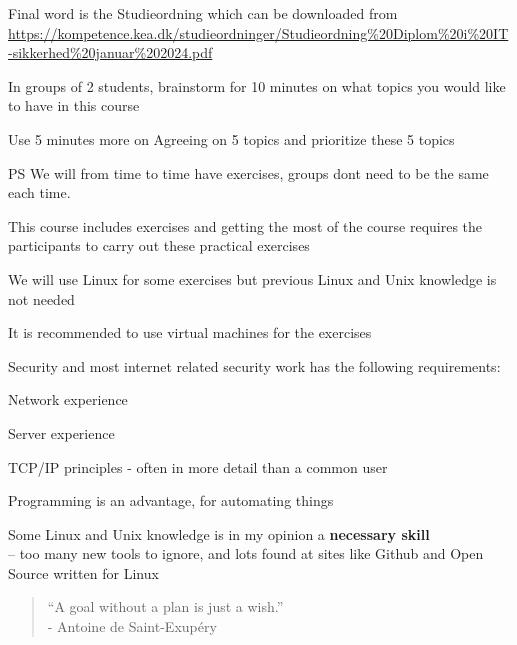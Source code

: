 \documentclass[Screen16to9,17pt]{foils}
\begin{document}
Final word is the Studieordning which can be downloaded from\\
{\footnotesize \url{https://kompetence.kea.dk/studieordninger/Studieordning%20Diplom%20i%20IT-sikkerhed%20januar%202024.pdf}}




In groups of 2 students, brainstorm for 10 minutes on what topics you would like to have in this course

Use 5 minutes more on Agreeing on 5 topics and prioritize these 5 topics

\vskip 1cm
PS We will from time to time have exercises, groups dont need to be the same each time.



\begin{list1}
\item This course includes exercises and getting the most of the course requires the participants to carry out these practical exercises
\item We will use Linux for some exercises but previous Linux and Unix knowledge is not needed
\item It is recommended to use virtual machines for the exercises
\item Security and most internet related security work has the following requirements:
\begin{list2}
\item Network experience
\item Server experience
\item TCP/IP principles - often in more detail than a common user
\item Programming is an advantage, for automating things
\item Some Linux and Unix knowledge is in my opinion a {\bf necessary skill}\\
-- too many new tools to ignore, and lots found at sites like Github and Open Source written for Linux
\end{list2}
\end{list1}





\begin{quote}
  “A goal without a plan is just a wish.”\\
  - Antoine de Saint-Exupéry
\end{quote}
\end{document}
